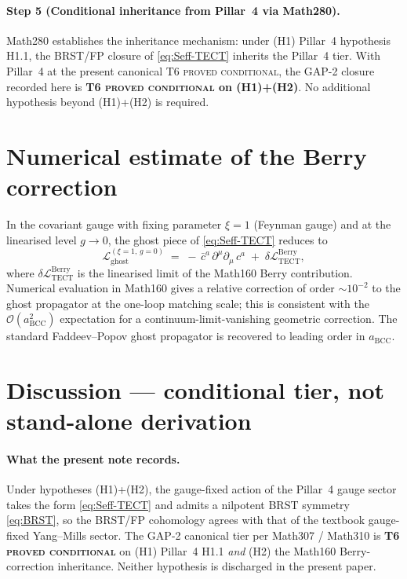 \paragraph{Step 5 (Conditional inheritance from Pillar~4 via
Math280).}
Math280 establishes the inheritance mechanism: under (H1) Pillar~4
hypothesis H1.1, the BRST/FP closure of \eqref{eq:Seff-TECT}
inherits the Pillar~4 tier. With Pillar~4 at the present canonical
T6 \textsc{proved conditional}, the GAP-2 closure recorded here is
\textbf{T6 \textsc{proved conditional} on (H1)+(H2)}.
No additional hypothesis beyond (H1)+(H2) is required.

\section{Numerical estimate of the Berry correction}
\label{sec:numerics}

In the covariant gauge with fixing parameter $\xi = 1$ (Feynman
gauge) and at the linearised level $g\to 0$, the ghost piece of
\eqref{eq:Seff-TECT} reduces to
\begin{equation}\label{eq:Lghost-feynman}
  \mathcal{L}_{\mathrm{ghost}}^{(\xi=1,\,g=0)}
  \;=\;
  -\,\bar c^{a}\,\partial^{\mu}\partial_{\mu}\,c^{a}
  \;+\;\delta\mathcal{L}^{\mathrm{Berry}}_{\mathrm{TECT}},
\end{equation}
where $\delta\mathcal{L}^{\mathrm{Berry}}_{\mathrm{TECT}}$ is the
linearised limit of the Math160 Berry contribution. Numerical
evaluation in Math160 gives a relative correction of order
$\sim 10^{-2}$ to the ghost propagator at the one-loop matching
scale; this is consistent with the $\mathcal{O}(a_{\mathrm{BCC}}^{2})$
expectation for a continuum-limit-vanishing geometric correction.
The standard Faddeev--Popov ghost propagator is recovered to leading
order in $a_{\mathrm{BCC}}$.

\section{Discussion --- conditional tier, not stand-alone derivation}
\label{sec:discussion}

\paragraph{What the present note records.}
Under hypotheses (H1)+(H2), the gauge-fixed action of the Pillar~4
gauge sector takes the form \eqref{eq:Seff-TECT} and admits a
nilpotent BRST symmetry \eqref{eq:BRST}, so the BRST/FP cohomology
agrees with that of the textbook gauge-fixed Yang--Mills sector. The
GAP-2 canonical tier per Math307 / Math310 is \textbf{T6 \textsc{proved
conditional}} on (H1) Pillar~4 H1.1 \emph{and} (H2) the Math160
Berry-correction inheritance. Neither hypothesis is discharged in the
present paper.

